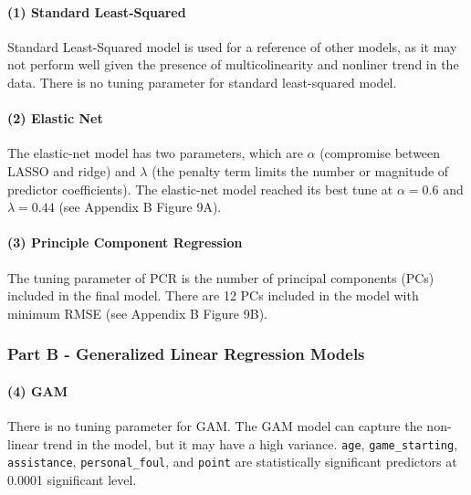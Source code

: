 \documentclass[
]{article}
\begin{document}
\hypertarget{standard-least-squared}{%
\paragraph{(1) Standard Least-Squared}\label{standard-least-squared}}

Standard Least-Squared model is used for a reference of other models, as
it may not perform well given the presence of multicolinearity and
nonliner trend in the data. There is no tuning parameter for standard
least-squared model.

\hypertarget{elastic-net}{%
\paragraph{(2) Elastic Net}\label{elastic-net}}

The elastic-net model has two parameters, which are \(\alpha\)
(compromise between LASSO and ridge) and \(\lambda\) (the penalty term
limits the number or magnitude of predictor coefficients). The
elastic-net model reached its best tune at \(\alpha = 0.6\) and
\(\lambda = 0.44\) (see Appendix B Figure 9A).

\hypertarget{principle-component-regression}{%
\paragraph{(3) Principle Component
Regression}\label{principle-component-regression}}

The tuning parameter of PCR is the number of principal components (PCs)
included in the final model. There are 12 PCs included in the model with
minimum RMSE (see Appendix B Figure 9B).

\hypertarget{part-b---generalized-linear-regression-models}{%
\subsubsection{Part B - Generalized Linear Regression
Models}\label{part-b---generalized-linear-regression-models}}

\hypertarget{gam}{%
\paragraph{(4) GAM}\label{gam}}

There is no tuning parameter for GAM. The GAM model can capture the
non-linear trend in the model, but it may have a high variance.
\texttt{age}, \texttt{game\_starting}, \texttt{assistance},
\texttt{personal\_foul}, and \texttt{point} are statistically
significant predictors at 0.0001 significant level.
\end{document}

